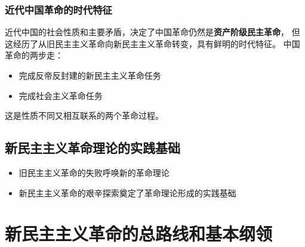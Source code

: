 \documentclass[12pt,openany]{ctexbook}
\begin{document}
\subsubsection{近代中国革命的时代特征}
近代中国的社会性质和主要矛盾，决定了中国革命仍然是\textbf{资产阶级民主革命}， 但这经历了从旧民主主义革命向新民主主义革命转变，具有鲜明的时代特征。
中国革命的两步走：
\begin{itemize}
  \item 完成反帝反封建的新民主主义革命任务
  \item 完成社会主义革命任务
\end{itemize}
这是性质不同又相互联系的两个革命过程。
\subsection{新民主主义革命理论的实践基础}
\begin{itemize}
  \item 旧民主主义革命的失败呼唤新的革命理论
  \item 新民主主义革命的艰辛探索奠定了革命理论形成的实践基础
\end{itemize}
\section{新民主主义革命的总路线和基本纲领}
\end{document}
